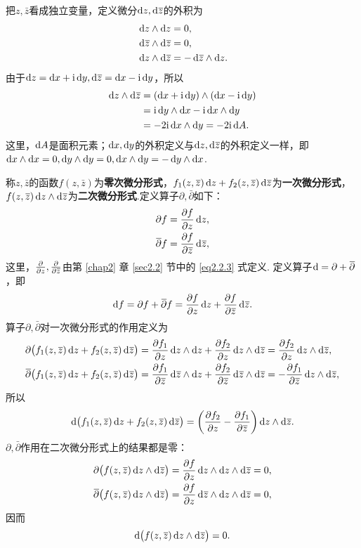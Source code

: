 把$z,\bar z$看成独立变量，定义微分$\dz,\dzz$的外积为
\begin{align*}
  & \dz\wedge \dz = 0,\\
  & \dzz\wedge \dzz = 0,\\
  & \dz\wedge \dzz = -\dzz\wedge \dz.
\end{align*}
由于$\dz=\dx+\ii\dy,\dzz=\dx-\ii\dy$，所以
\begin{align*}
  \dz\wedge\dzz & = (\dx+\ii\dy)\wedge(\dx-\ii\dy)\\
  & = \ii\dy\wedge\dx-\ii\dx\wedge\dy\\
  & = -2\ii\dx\wedge\dy = -2\ii\dif A.
\end{align*}
这里，$\dif A$是面积元素；$\dx,\dy$的外积定义与$\dz,\dzz$的外积定义一样，即$\dx\wedge\dx=0,\dy\wedge\dy=0,\dx\wedge\dy=-\dy\wedge\dx$.

称$z,\bar z$的函数$f(z,\bar z)$为\textbf{零次微分形式}，$f_1(z,\bar z)\dz+f_2(z,\bar z)\dzz$为\textbf{一次微分形式}，$f(z,\bar z)\dz\wedge\dzz$为\textbf{二次微分形式}.定义算子$\partial,\bar\partial$如下：
\begin{align*}
  & \partial f = \pp fz\dz,\\
  & \bar \partial f = \pp f{\bar z}\dzz,
\end{align*}
这里，$\pp{}z,\pp{}{\bar z}$由第 \ref{chap2} 章 \ref{sec2.2} 节中的 \eqref{eq2.2.3} 式定义. 定义算子$\dif =\partial+\bar\partial$，即
\begin{equation}\label{eq3.6.1}
  \dif f = \partial f + \bar\partial f = \pp fz\dz + \pp f{\bar z}\dzz.
\end{equation}
算子$\partial,\bar\partial$对一次微分形式的作用定义为
\begin{align*}
  \partial\big(f_1(z,\bar z)\dz+f_2(z,\bar z)\dzz\big)
  & = \pp{f_1}z\dz \wedge \dz + \pp{f_2}z \dz\wedge\dzz = \pp{f_2}z\dz \wedge \dzz,\\
  \bar\partial\big(f_1(z,\bar z)\dz+f_2(z,\bar z)\dzz\big)
  & = \pp{f_1}{\bar z}\dzz\wedge\dz+\pp{f_2}{\bar z}\dzz\wedge\dzz=-\pp{f_1}{\bar z}\dz\wedge\dzz,
\end{align*}
所以
\begin{equation}\label{eq3.6.2}
  \dif \big(f_1(z,\bar z)\dz + f_2(z,\bar z)\dzz\big)
  = \bigg(\pp{f_2}z-\pp{f_1}{\bar z}\bigg)\dz\wedge\dzz.
\end{equation}
$\partial,\bar\partial$作用在二次微分形式上的结果都是零：
\begin{align*}
  & \partial\big(f(z,\bar z)\dz\wedge\dzz\big) = \pp fz\dz\wedge\dz\wedge\dzz = 0,\\
  & \bar\partial\big(f(z,\bar z)\dz\wedge\dzz\big) = \pp fz\dzz\wedge\dz\wedge\dzz = 0,
\end{align*}
因而
\begin{equation}\label{eq3.6.3}
  \dif \big(f(z,\bar z)\dz\wedge\dzz\big)=0.
\end{equation}

